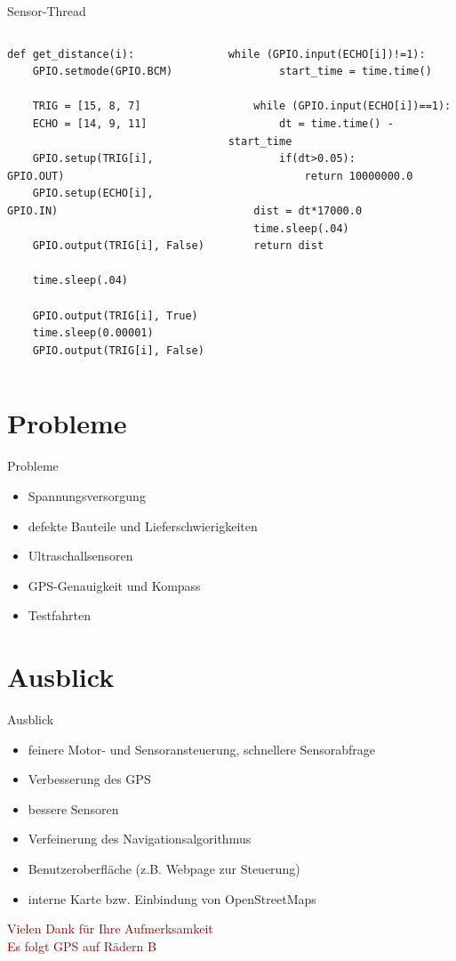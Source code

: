\begin{frame}[containsverbatim]{Sensor-Thread}
\begin{columns}
\column{0.49\paperwidth}
\begin{lstlisting}[tabsize=2, basicstyle=\ttfamily\scriptsize]
def get_distance(i):
	GPIO.setmode(GPIO.BCM)

	TRIG = [15, 8, 7]  
	ECHO = [14, 9, 11] 

	GPIO.setup(TRIG[i], GPIO.OUT)
	GPIO.setup(ECHO[i], GPIO.IN)

	GPIO.output(TRIG[i], False)

	time.sleep(.04)

	GPIO.output(TRIG[i], True)
	time.sleep(0.00001)
	GPIO.output(TRIG[i], False)
\end{lstlisting}	
\column{0.49\paperwidth}
\begin{lstlisting}[tabsize=2, basicstyle=\ttfamily\scriptsize]
	while (GPIO.input(ECHO[i])!=1):
		start_time = time.time()
	
	while (GPIO.input(ECHO[i])==1):
		dt = time.time() - start_time
		if(dt>0.05):
			return 10000000.0

	dist = dt*17000.0
	time.sleep(.04)
	return dist
\end{lstlisting}
\end{columns}
\end{frame}

\section{Probleme}

\begin{frame}{Probleme}
\begin{itemize}
\item Spannungsversorgung
\item defekte Bauteile und Lieferschwierigkeiten
\item Ultraschallsensoren
\item GPS-Genauigkeit und Kompass
\item Testfahrten
\end{itemize}
\end{frame}

\section{Ausblick}

\begin{frame}{Ausblick}
\begin{itemize}
\item feinere Motor- und Sensoransteuerung, schnellere Sensorabfrage
\item Verbesserung des GPS
\item bessere Sensoren
\item Verfeinerung des Navigationsalgorithmus
\item Benutzeroberfläche (z.B. Webpage zur Steuerung)
\item interne Karte bzw. Einbindung von OpenStreetMaps
\end{itemize}
\end{frame}

\begin{frame}
\begin{center}
\textcolor{darkred}{
Vielen Dank für Ihre Aufmerksamkeit
\\[1cm]
Es folgt GPS auf Rädern B}
\end{center}
\end{frame}
